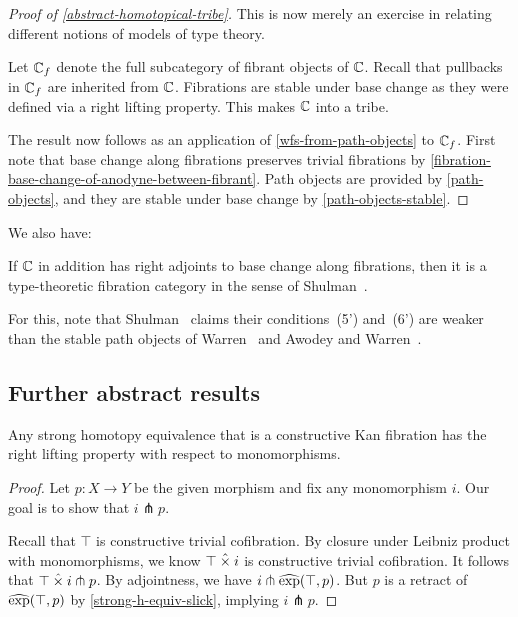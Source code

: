 \documentclass[reqno,10pt,a4paper,oneside]{amsart}
\begin{document}
\begin{proof}[Proof of \cref{abstract-homotopical-tribe}]
This is now merely an exercise in relating different notions of models of type theory.

Let $\mathbb{C}_f$ denote the full subcategory of fibrant objects of $\mathbb{C}$.
Recall that pullbacks in $\mathbb{C}_f$ are inherited from $\mathbb{C}$.
Fibrations are stable under base change as they were defined via a right lifting property.
This makes $\mathbb{C}$ into a tribe.

The result now follows as an application of \cref{wfs-from-path-objects} to $\mathbb{C}_f$.
First note that base change along fibrations preserves trivial fibrations by \cref{fibration-base-change-of-anodyne-between-fibrant}.
Path objects are provided by \cref{path-objects}, and they are stable under base change by \cref{path-objects-stable}.
\end{proof}

We also have:

\begin{theorem}
If $\mathbb{C}$ in addition has right adjoints to base change along fibrations, then it is a type-theoretic fibration category in the sense of Shulman~\cite{shulman:inverse-diagrams}.
\end{theorem}

For this, note that Shulman~\cite{shulman:inverse-diagrams} claims their conditions~(5') and~(6') are weaker than the stable path objects of Warren~\cite{warren:thesis} and Awodey and Warren~\cite{awodey-warren:homotopy-idtype}.

\subsection{Further abstract results}

\begin{lemma}
Any strong homotopy equivalence that is a constructive Kan fibration has the right lifting property with respect to monomorphisms.
\end{lemma}

\begin{proof}
\label{strong-h-equiv-kan-is-trivial}
Let $p : X \to Y$ be the given morphism and fix any monomorphism $i$.
Our goal is to show that $i \pitchfork p$.

Recall that $\top$ is constructive trivial cofibration.
By closure under Leibniz product with monomorphisms, we know $\top \mathbin{\hat{\times}} i$ is constructive trivial cofibration.
It follows that $\top \mathbin{\hat{\times}} i \pitchfork p$.
By adjointness, we have $i \pitchfork \operatorname{\widehat{exp}}(\top, p)$.
But $p$ is a retract of $\operatorname{\widehat{exp}}(\top, p)$ by \cref{strong-h-equiv-slick}, implying $i \pitchfork p$.
\end{proof}
\end{document}
